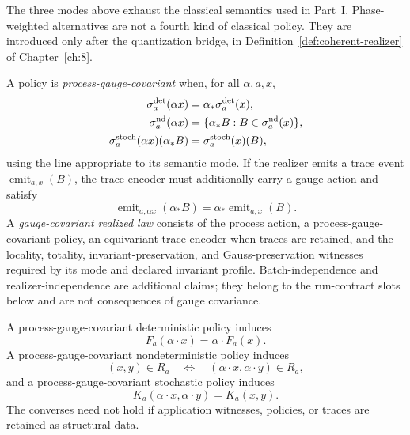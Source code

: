 The three modes above exhaust the classical semantics used in Part~I.
Phase-weighted alternatives are not a fourth kind of classical policy.  They
are introduced only after the quantization bridge, in
Definition~\ref{def:coherent-realizer} of Chapter~\ref{ch:8}.

\begin{definition}
\label{def:process-gauge-covariance}
A policy is \emph{process-gauge-covariant} when, for all $\alpha,a,x$,
\begin{align*}
\sigma_a^{\rm det}(\alpha x)
   &=\alpha_*\sigma_a^{\rm det}(x),\\
 \sigma_a^{\rm nd}(\alpha x)
   &=\{\alpha_*B:B\in\sigma_a^{\rm nd}(x)\},\\
 \sigma_a^{\rm stoch}(\alpha x)(\alpha_*B)
   &=\sigma_a^{\rm stoch}(x)(B),
\end{align*}
using the line appropriate to its semantic mode.  If the realizer emits a
trace event $\operatorname{emit}_{a,x}(B)$, the trace encoder must additionally
carry a gauge action and satisfy
\[
 \operatorname{emit}_{a,\alpha x}(\alpha_*B)
 =\alpha_*\operatorname{emit}_{a,x}(B).
\]
A \emph{gauge-covariant realized law} consists of the process action, a
process-gauge-covariant policy, an equivariant trace encoder when traces are
retained, and the locality, totality, invariant-preservation, and
Gauss-preservation witnesses required by its mode and declared invariant
profile.  Batch-independence and realizer-independence are additional claims;
they belong to the run-contract slots below and are not consequences of gauge
covariance.
\end{definition}

\begin{proposition}
\label{prop:process-covariance}
A process-gauge-covariant deterministic policy induces
\begin{equation}
F_a(\alpha\cdot x)=\alpha\cdot F_a(x).
 \label{eq:law-gauge-covariance}
\end{equation}
A process-gauge-covariant nondeterministic policy induces
\[
 (x,y)\in R_a
 \quad\Longleftrightarrow\quad
 (\alpha\cdot x,\alpha\cdot y)\in R_a,
\]
and a process-gauge-covariant stochastic policy induces
\[
 K_a(\alpha\cdot x,\alpha\cdot y)=K_a(x,y).
\]
The converses need not hold if application witnesses, policies, or traces are
retained as structural data.
\end{proposition}

